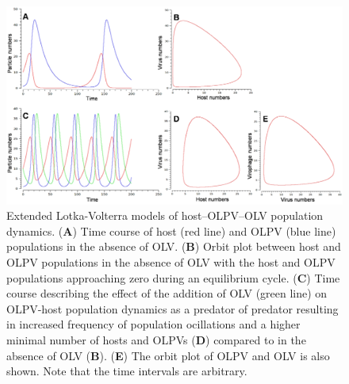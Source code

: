 \begin{figure}
\includegraphics[width=\textwidth]{olv_figures/LV.jpg}
\caption[Lotka-Volterra models of host--OLPV--OLV population dynamics]{Extended Lotka-Volterra models of host--OLPV--OLV population dynamics. 
(\textbf{A}) Time course of host (red line) and \ac{OLPV} (blue line) populations in the absence of \ac{OLV}. 
(\textbf{B}) Orbit plot between host and \ac{OLPV} populations in the absence of \ac{OLV} with the host and \ac{OLPV} populations approaching zero during an equilibrium cycle. 
(\textbf{C}) Time course describing the effect of the addition of \ac{OLV} (green line) on OLPV-host population dynamics as a predator of predator resulting in increased frequency of population ocillations and a higher minimal number of hosts and \acp{OLPV} (\textbf{D}) compared to in the absence of OLV (\textbf{B}). 
(\textbf{E}) The orbit plot of \ac{OLPV} and \ac{OLV} is also shown. 
Note that the time intervals are arbitrary.
}
\label{fig:LV}

\end{figure}

